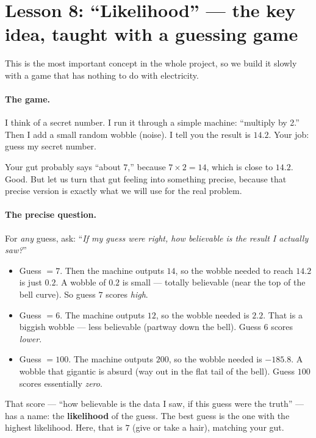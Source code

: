 \documentclass[11pt]{article}
\begin{document}
\section{Lesson 8: ``Likelihood'' --- the key idea, taught with a guessing game}

This is the most important concept in the whole project, so we build it
slowly with a game that has nothing to do with electricity.

\paragraph{The game.} I think of a secret number. I run it through a simple
machine: ``multiply by 2.'' Then I add a small random wobble (noise). I tell
you the result is $14.2$. Your job: guess my secret number.

Your gut probably says ``about $7$,'' because $7\times2 = 14$, which is close
to $14.2$. Good. But let us turn that gut feeling into something precise,
because that precise version is exactly what we will use for the real problem.

\paragraph{The precise question.} For \emph{any} guess, ask: ``\emph{If my
guess were right, how believable is the result I actually saw?}''

\begin{itemize}[leftmargin=2em]
\item Guess $= 7$. Then the machine outputs $14$, so the wobble needed to
reach $14.2$ is just $0.2$. A wobble of $0.2$ is small --- totally believable
(near the top of the bell curve). So guess $7$ scores \emph{high}.
\item Guess $= 6$. The machine outputs $12$, so the wobble needed is $2.2$.
That is a biggish wobble --- less believable (partway down the bell). Guess $6$
scores \emph{lower}.
\item Guess $= 100$. The machine outputs $200$, so the wobble needed is
$-185.8$. A wobble that gigantic is absurd (way out in the flat tail of the
bell). Guess $100$ scores essentially \emph{zero}.
\end{itemize}

That score --- ``how believable is the data I saw, if this guess were the
truth'' --- has a name: the \textbf{likelihood} of the guess. The best guess is
the one with the highest likelihood. Here, that is $7$ (give or take a hair),
matching your gut.
\end{document}
